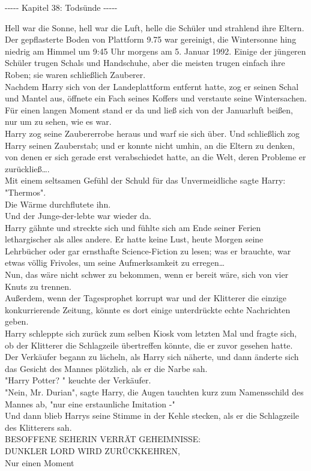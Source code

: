

\hypertarget{todsuxfcnde}{%

-\/-\/-\/-\/- Kapitel 38: Todsünde -\/-\/-\/-\/-

Hell war die Sonne, hell war die Luft, helle die Schüler und strahlend ihre Eltern. Der gepflasterte Boden von Plattform 9.75 war gereinigt, die Wintersonne hing niedrig am Himmel um 9:45 Uhr morgens am 5. Januar 1992. Einige der jüngeren Schüler trugen Schals und Handschuhe, aber die meisten trugen einfach ihre Roben; sie waren schließlich Zauberer.\\ Nachdem Harry sich von der Landeplattform entfernt hatte, zog er seinen Schal und Mantel aus, öffnete ein Fach seines Koffers und verstaute seine Wintersachen.\\ Für einen langen Moment stand er da und ließ sich von der Januarluft beißen, nur um zu sehen, wie es war.\\ Harry zog seine Zaubererrobe heraus und warf sie sich über. Und schließlich zog Harry seinen Zauberstab; und er konnte nicht umhin, an die Eltern zu denken, von denen er sich gerade erst verabschiedet hatte, an die Welt, deren Probleme er zurückließ….\\ Mit einem seltsamen Gefühl der Schuld für das Unvermeidliche sagte Harry: "Thermos".\\ Die Wärme durchflutete ihn.\\ Und der Junge-der-lebte war wieder da.\\ Harry gähnte und streckte sich und fühlte sich am Ende seiner Ferien lethargischer als alles andere. Er hatte keine Lust, heute Morgen seine Lehrbücher oder gar ernsthafte Science-Fiction zu lesen; was er brauchte, war etwas völlig Frivoles, um seine Aufmerksamkeit zu erregen…\\ Nun, das wäre nicht schwer zu bekommen, wenn er bereit wäre, sich von vier Knuts zu trennen.\\ Außerdem, wenn der Tagesprophet korrupt war und der Klitterer die einzige konkurrierende Zeitung, könnte es dort einige unterdrückte echte Nachrichten geben.\\ Harry schleppte sich zurück zum selben Kiosk vom letzten Mal und fragte sich, ob der Klitterer die Schlagzeile übertreffen könnte, die er zuvor gesehen hatte.\\ Der Verkäufer begann zu lächeln, als Harry sich näherte, und dann änderte sich das Gesicht des Mannes plötzlich, als er die Narbe sah.\\ "Harry Potter? " keuchte der Verkäufer.\\ "Nein, Mr. Durian", sagte Harry, die Augen tauchten kurz zum Namensschild des Mannes ab, "nur eine erstaunliche Imitation -"\\ Und dann blieb Harrys seine Stimme in der Kehle stecken, als er die Schlagzeile des Klitterers sah.\\ BESOFFENE SEHERIN VERRÄT GEHEIMNISSE:\\ DUNKLER LORD WIRD ZURÜCKKEHREN,\\ Nur einen Moment }
